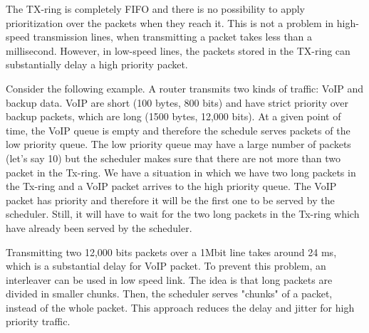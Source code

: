 The TX-ring is completely FIFO and there is no possibility to apply prioritization over the packets when they reach it.
This is not a problem in high-speed transmission lines, when transmitting a packet takes less than a millisecond.
However, in low-speed lines, the packets stored in the TX-ring can substantially delay a high priority packet.

Consider the following example.
A router transmits two kinds of traffic: VoIP and backup data.
VoIP are short (100 bytes, 800 bits) and have strict priority over backup packets, which are long (1500 bytes, 12,000 bits).
At a given point of time, the VoIP queue is empty and therefore the schedule serves packets of the low priority queue.
The low priority queue may have a large number of packets (let's say 10) but the scheduler makes sure that there are not more than two packet in the Tx-ring.
We have a situation in which we have two long packets in the Tx-ring and a VoIP packet arrives to the high priority queue.
The VoIP packet has priority and therefore it will be the first one to be served by the scheduler.
Still, it will have to wait for the two long packets in the Tx-ring which have already been served by the scheduler.

Transmitting two 12,000 bits packets over a 1Mbit line takes around 24 ms, which is a substantial delay for VoIP packet.
To prevent this problem, an interleaver can be used in low speed link.
The idea is that long packets are divided in smaller chunks.
Then, the scheduler serves "chunks" of a packet, instead of the whole packet.
This approach reduces the delay and jitter for high priority traffic.
